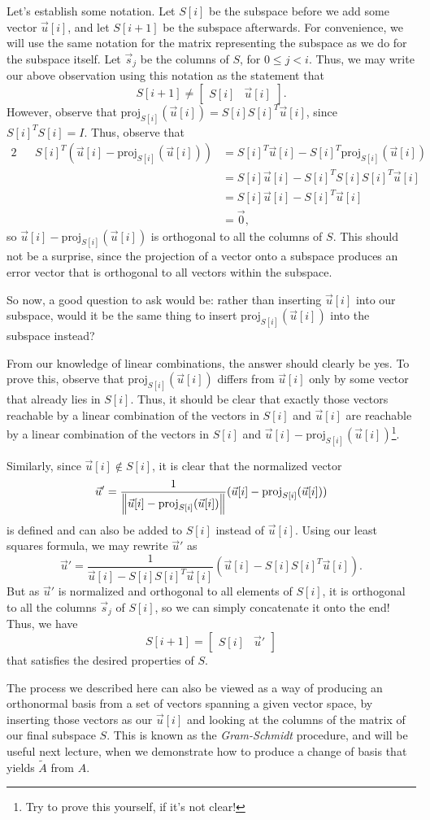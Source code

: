 \documentclass[letterpaper]{article}
\theoremstyle{remark}
\renewcommand{\tilde}[1]{\widetilde{#1}}
\newcommand{\mat}[1]{\ensuremath{\begin{bmatrix}#1\end{bmatrix}}}
\newcommand{\eqn}[1]{\begin{alignat*}{2}#1\end{alignat*}}
\begin{document}
Let's establish some notation. Let $S[i]$ be the subspace before we add some vector $\vec{u}[i]$, and let $S[i + 1]$ be the subspace afterwards. For convenience, we will use the same notation for the matrix representing the subspace as we do for the subspace itself. Let $\vec{s}_j$ be the columns of $S$, for $0 \le j < i$. Thus, we may write our above observation using this notation as the statement that
\[
    S[i + 1] \ne \mat{S[i] & \vec{u}[i]}.
\]
However, observe that $\text{proj}_{S[i]}(\vec{u}[i]) = S[i]S[i]^T\vec{u}[i]$, since $S[i]^TS[i] = I$. Thus, observe that
\eqn{
    && S[i]^T(\vec{u}[i] - \text{proj}_{S[i]}(\vec{u}[i])) &= S[i]^T \vec{u}[i] - S[i]^T\text{proj}_{S[i]}(\vec{u}[i]) \\
    &&&= S[i]\vec{u}[i] - S[i]^TS[i]S[i]^T\vec{u}[i] \\
    &&&= S[i]\vec{u}[i] - S[i]^T\vec{u}[i] \\
    &&&= \vec{0},
}
so $\vec{u}[i] - \text{proj}_{S[i]}(\vec{u}[i])$ is orthogonal to all the columns of $S$. This should not be a surprise, since the projection of a vector onto a subspace produces an error vector that is orthogonal to all vectors within the subspace.

So now, a good question to ask would be: rather than inserting $\vec{u}[i]$ into our subspace, would it be the same thing to insert $\text{proj}_{S[i]}(\vec{u}[i])$ into the subspace instead? 

From our knowledge of linear combinations, the answer should clearly be yes. To prove this, observe that $\text{proj}_{S[i]}(\vec{u}[i])$ differs from $\vec{u}[i]$ only by some vector that already lies in $S[i]$. Thus, it should be clear that  exactly those vectors reachable by a linear combination of the vectors in $S[i]$ and $\vec{u}[i]$ are reachable by a linear combination of the vectors in $S[i]$ and $\vec{u}[i] - \text{proj}_{S[i]}(\vec{u}[i])$\footnote{Try to prove this yourself, if it's not clear!}.

Similarly, since $\vec{u}[i] \not\in S[i]$, it is clear that the normalized vector 
\[
    \vec{u}' = \frac{1}{\norm{\vec{u}[i] - \text{proj}_{S[i]}(\vec{u}[i])}}(\vec{u}[i] - \text{proj}_{S[i]}(\vec{u}[i]))
\]
is defined and can also be added to $S[i]$ instead of $\vec{u}[i]$. Using our least squares formula, we may rewrite $\vec{u}'$ as
\[
    \vec{u}' = \frac{1}{\vec{u}[i] - S[i]S[i]^T\vec{u}[i]} (\vec{u}[i] - S[i]S[i]^T\vec{u}[i]).
\]
But as $\vec{u}'$ is normalized and orthogonal to all elements of $S[i]$, it is orthogonal to all the columns $\vec{s}_j$ of $S[i]$, so we can simply concatenate it onto the end! Thus, we have
\[
    S[i + 1] = \mat{S[i] & \vec{u}'}
\]
that satisfies the desired properties of $S$.

The process we described here can also be viewed as a way of producing an orthonormal basis from a set of vectors spanning a given vector space, by inserting those vectors as our $\vec{u}[i]$ and looking at the columns of the matrix of our final subspace $S$. This is known as the \emph{Gram-Schmidt} procedure, and will be useful next lecture, when we demonstrate how to produce a change of basis that yields $\tilde{A}$ from $A$.
\end{document}
